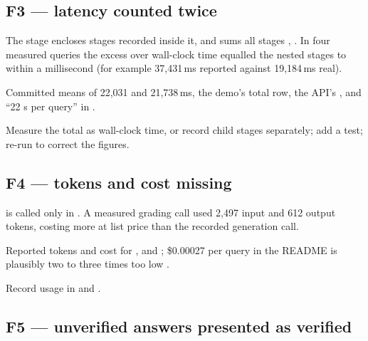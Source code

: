 \subsection*{F3 --- latency counted twice}

\begin{description}[style=nextline]
  \item[Evidence] The  stage encloses stages recorded inside it, and  sums all stages , . In four measured queries the excess over wall-clock time equalled the nested stages to within a millisecond (for example 37,431\,ms reported against 19,184\,ms real).
  \item[Impact] Committed means of 22,031 and 21,738\,ms, the demo's total row, the API's , and \enquote{22 s per query} in .
  \item[Fix] Measure the total as wall-clock time, or record child stages separately; add a test; re-run to correct the figures.
\end{description}

\subsection*{F4 --- tokens and cost missing}

\begin{description}[style=nextline]
  \item[Evidence]  is called only in . A measured grading call used 2,497 input and 612 output tokens, costing more at list price than the recorded generation call.
  \item[Impact] Reported tokens and cost for ,  and ; \$0.00027 per query in the README is plausibly two to three times too low \tagI.
  \item[Fix] Record usage in  and .
\end{description}

\subsection*{F5 --- unverified answers presented as verified}

